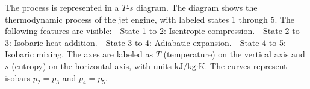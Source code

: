 The process is represented in a \( T \)-\( s \) diagram. The diagram shows the thermodynamic process of the jet engine, with labeled states 1 through 5. The following features are visible:  
- State 1 to 2: Isentropic compression.  
- State 2 to 3: Isobaric heat addition.  
- State 3 to 4: Adiabatic expansion.  
- State 4 to 5: Isobaric mixing.  
The axes are labeled as \( T \) (temperature) on the vertical axis and \( s \) (entropy) on the horizontal axis, with units \( \text{kJ/kg·K} \). The curves represent isobars \( p_2 = p_3 \) and \( p_4 = p_5 \).